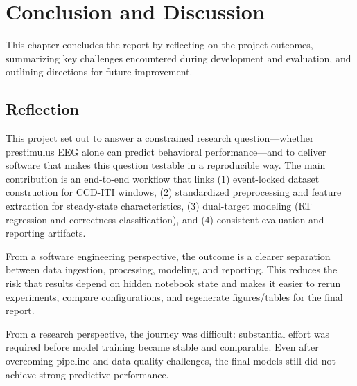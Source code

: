 \chapter{Conclusion and Discussion}
\label{chap:conclusion-discussion}

\noindent
This chapter concludes the report by reflecting on the project outcomes, summarizing key challenges encountered during development and evaluation, and outlining directions for future improvement.
\vspace{1em}

\section{Reflection}
This project set out to answer a constrained research question---whether prestimulus EEG alone can predict behavioral performance---and to deliver software that makes this question testable in a reproducible way. The main contribution is an end-to-end workflow that links (1) event-locked dataset construction for CCD-ITI windows, (2) standardized preprocessing and feature extraction for steady-state characteristics, (3) dual-target modeling (RT regression and correctness classification), and (4) consistent evaluation and reporting artifacts.

From a software engineering perspective, the outcome is a clearer separation between data ingestion, processing, modeling, and reporting. This reduces the risk that results depend on hidden notebook state and makes it easier to rerun experiments, compare configurations, and regenerate figures/tables for the final report.

From a research perspective, the journey was difficult: substantial effort was required before model training became stable and comparable. Even after overcoming pipeline and data-quality challenges, the final models still did not achieve strong predictive performance.

